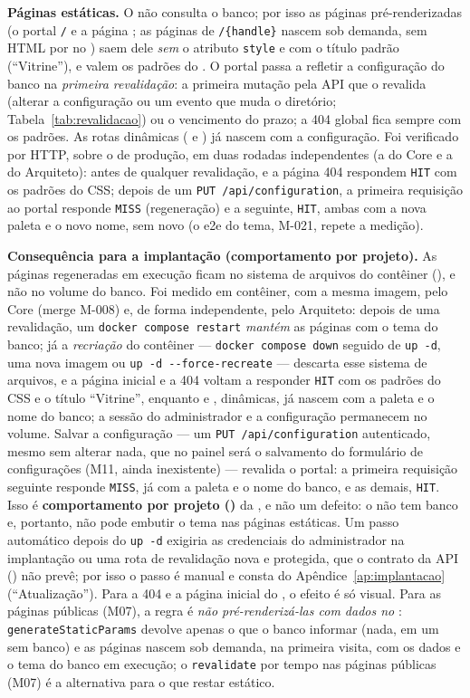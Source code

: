 \textbf{Páginas estáticas.} O  não consulta o banco; por isso as páginas pré-renderizadas (o portal \texttt{/} e a página ; as páginas de \texttt{/\{handle\}} nascem sob demanda, sem HTML por  no ) saem dele \emph{sem} o atributo \texttt{style} e com o título padrão (``Vitrine''), e valem os padrões do . O portal passa a refletir a configuração do banco na \emph{primeira revalidação}: a primeira mutação pela API que o revalida (alterar a configuração ou um evento que muda o diretório; Tabela~\ref{tab:revalidacao}) ou o vencimento do prazo; a 404 global fica sempre com os padrões. As rotas dinâmicas ( e ) já nascem com a configuração. Foi verificado por HTTP, sobre o  de produção, em duas rodadas independentes (a do Core e a do Arquiteto): antes de qualquer revalidação, \arq{/} e a página 404 respondem \texttt{HIT} com os padrões do CSS; depois de um \texttt{PUT /api/configuration}, a primeira requisição ao portal responde \texttt{MISS} (regeneração) e a seguinte, \texttt{HIT}, ambas com a nova paleta e o novo nome, sem novo  (o e2e do tema, M-021, repete a medição).

\textbf{Consequência para a implantação (comportamento por projeto).} As páginas regeneradas em execução ficam no sistema de arquivos do contêiner (), e não no volume do banco. Foi medido em contêiner, com a mesma imagem, pelo Core (merge M-008) e, de forma independente, pelo Arquiteto: depois de uma revalidação, um \texttt{docker compose restart} \emph{mantém} as páginas com o tema do banco; já a \emph{recriação} do contêiner --- \texttt{docker compose down} seguido de \texttt{up -d}, uma nova imagem ou \texttt{up -d -{}-force-recreate} --- descarta esse sistema de arquivos, e a página inicial e a 404 voltam a responder \texttt{HIT} com os padrões do CSS e o título ``Vitrine'', enquanto  e , dinâmicas, já nascem com a paleta e o nome do banco; a sessão do administrador e a configuração permanecem no volume. Salvar a configuração --- um \texttt{PUT /api/configuration} autenticado, mesmo sem alterar nada, que no painel será o salvamento do formulário de configurações (M11, ainda inexistente) --- revalida o portal: a primeira requisição seguinte responde \texttt{MISS}, já com a paleta e o nome do banco, e as demais, \texttt{HIT}. Isso é \textbf{comportamento por projeto ()} da , e não um defeito: o  não tem banco e, portanto, não pode embutir o tema nas páginas estáticas. Um passo automático depois do \texttt{up -d} exigiria as credenciais do administrador na implantação ou uma rota de revalidação nova e protegida, que o contrato da API () não prevê; por isso o passo é manual e consta do Apêndice~\ref{ap:implantacao} (``Atualização''). Para a 404 e a página inicial do , o efeito é só visual. Para as páginas públicas (M07), a regra é \emph{não pré-renderizá-las com dados no }: \texttt{generateStaticParams} devolve apenas o que o banco informar (nada, em um  sem banco) e as páginas nascem sob demanda, na primeira visita, com os dados e o tema do banco em execução; o \texttt{revalidate} por tempo nas páginas públicas (M07) é a alternativa para o que restar estático.

